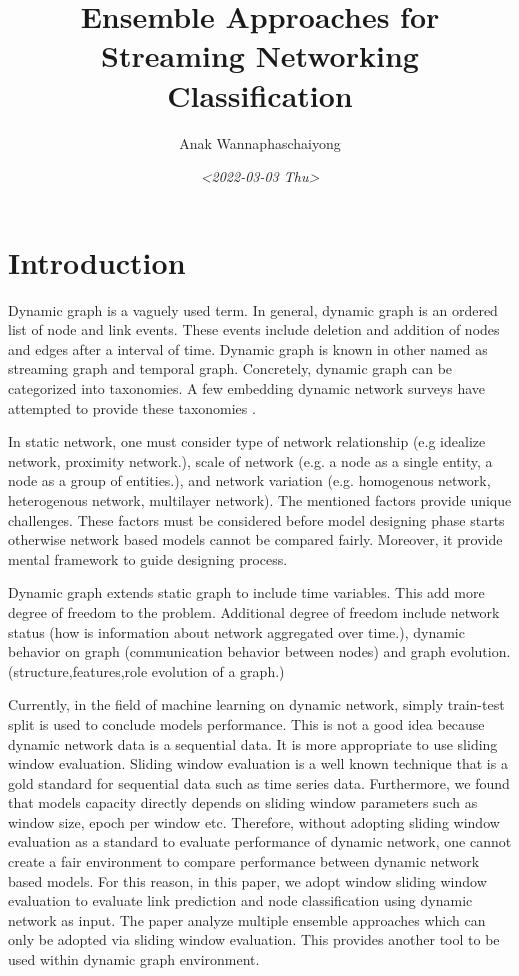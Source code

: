 \documentclass{IEEEtran}
\author{Anak Wannaphaschaiyong}
\date{\textit{<2022-03-03 Thu>}}
\title{Ensemble Approaches for Streaming Networking Classification}
\begin{document}
\maketitle

\section{Introduction}
\label{sec:org904139c}
Dynamic graph is a vaguely used term. In general, dynamic graph is an ordered list of node and link events. These events include deletion and addition of nodes and edges after a interval of time.
Dynamic graph is known in other named as streaming graph and temporal graph. Concretely, dynamic graph can be categorized into taxonomies. A few embedding dynamic network surveys have attempted to provide these taxonomies \cite{barrosSurveyEmbeddingDynamic2021,kazemiRepresentationLearningDynamica,skardingFoundationsModelingDynamic2021}.

In static network, one must consider type of network relationship (e.g idealize network, proximity network.), scale of network (e.g. a node as a single entity, a node as a group of entities.), and network variation (e.g. homogenous network, heterogenous network, multilayer network).
The mentioned factors provide unique challenges. These factors must be considered before model designing phase starts otherwise network based models cannot be compared fairly. Moreover, it provide mental framework to guide designing process.

Dynamic graph extends static graph to include time variables. This add more degree of freedom to the problem. Additional degree of freedom include network status (how is information about network aggregated over time.), dynamic behavior on graph (communication behavior between nodes) and graph evolution. (structure,features,role evolution of a graph.)

Currently, in the field of machine learning on dynamic network, simply train-test split is used to conclude models performance. This is not a good idea because dynamic network data is a sequential data. It is more appropriate to use sliding window evaluation. Sliding window evaluation is a well known technique that is a gold standard for sequential data such as time series data. Furthermore, we found that models capacity directly depends on sliding window parameters such as window size, epoch per window etc. Therefore, without adopting sliding window evaluation as a standard to evaluate performance of dynamic network, one cannot create a fair environment to compare performance between dynamic network based models.
For this reason, in this paper, we adopt window sliding window evaluation to evaluate link prediction and node classification using dynamic network as input.
The paper analyze multiple ensemble approaches which can only be adopted via sliding window evaluation. This provides another tool to be used within dynamic graph environment.
\end{document}
